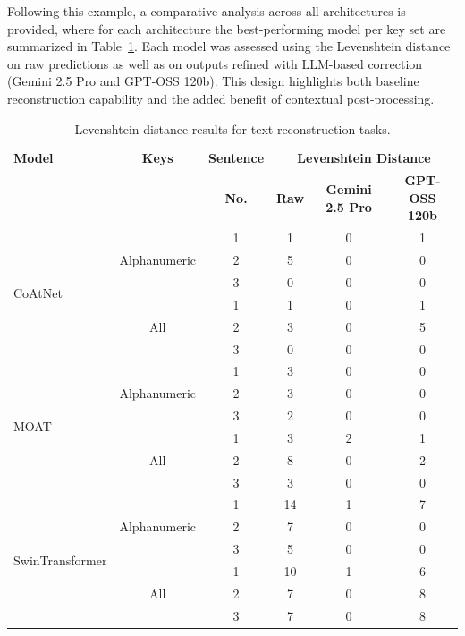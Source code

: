 \documentclass[a4paper,11pt,twoside]{report}
\theoremstyle{definition}
\begin{document}
Following this example, a comparative analysis across all architectures is provided, where for each architecture the best-performing model per key set are summarized in Table~\ref{tab:levenshtein_results}. Each model was assessed using the Levenshtein distance on raw predictions as well as on outputs refined with LLM-based correction (Gemini 2.5 Pro and GPT-OSS 120b). This design highlights both baseline reconstruction capability and the added benefit of contextual post-processing.


\begin{table}[h!]
\centering
\caption{Levenshtein distance results for text reconstruction tasks.}
\begin{adjustbox}{max width=\textwidth}
\begin{tabular}{l|c|c|c|c|c}
\hline
\textbf{Model} & \textbf{Keys} & \textbf{Sentence}  &  \multicolumn{3}{c}{\textbf{Levenshtein Distance}} \\
\cline{4-6}
       & & \textbf{No.}& \textbf{Raw}  &   \textbf{Gemini 2.5 Pro}   &  \textbf{GPT-OSS 120b} \\
\hline
\multirow{6}{*}{CoAtNet} & \multirow{3}{*}{Alphanumeric} & 1 & 1 & 0 & 1 \\
& & 2 & 5 & 0 & 0 \\
& & 3 & 0 & 0 & 0 \\
\cline{2-6}
& \multirow{3}{*}{All} & 1 & 1 & 0 & 1\\
& & 2 & 3 & 0 & 5\\
& & 3 & 0 & 0 & 0\\
\hline

\multirow{6}{*}{MOAT} & \multirow{3}{*}{Alphanumeric} & 1 & 3 & 0 & 0 \\
& & 2 & 3 & 0 & 0 \\
& & 3 & 2 & 0 & 0 \\
\cline{2-6}
& \multirow{3}{*}{All} & 1 & 3 & 2 & 1\\
& & 2 & 8 & 0 & 2 \\
& & 3 & 3 & 0 & 0 \\
\hline

\multirow{6}{*}{SwinTransformer} & \multirow{3}{*}{Alphanumeric} & 1 & 14 & 1 & 7 \\
& & 2 & 7 & 0 & 0 \\
& & 3 & 5 & 0 & 0 \\
\cline{2-6}
& \multirow{3}{*}{All} & 1 & 10 & 1 & 6 \\
& & 2 & 7 & 0 & 8 \\
& & 3 & 7 & 0 & 8\\
\hline
\end{tabular}
\end{adjustbox}
\label{tab:levenshtein_results}
\end{table}
\end{document}
